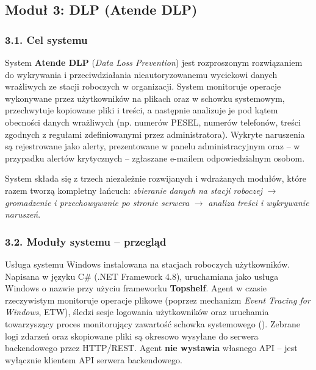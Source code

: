 \subsection*{Moduł 3: DLP (Atende DLP)}

\subsubsection*{3.1. Cel systemu}

System \textbf{Atende DLP} (\emph{Data Loss Prevention}) jest rozproszonym rozwiązaniem do wykrywania
i przeciwdziałania nieautoryzowanemu wyciekowi danych wrażliwych ze stacji roboczych w organizacji.
System monitoruje operacje wykonywane przez użytkowników na plikach oraz w schowku systemowym,
przechwytuje kopiowane pliki i treści, a następnie analizuje je pod kątem obecności danych
wrażliwych (np. numerów PESEL, numerów telefonów, treści zgodnych z regułami zdefiniowanymi przez
administratora). Wykryte naruszenia są rejestrowane jako alerty, prezentowane w panelu
administracyjnym oraz -- w przypadku alertów krytycznych -- zgłaszane e-mailem odpowiedzialnym
osobom.

System składa się z trzech niezależnie rozwijanych i wdrażanych modułów, które razem tworzą
kompletny łańcuch: \emph{zbieranie danych na stacji roboczej} $\rightarrow$ \emph{gromadzenie
i przechowywanie po stronie serwera} $\rightarrow$ \emph{analiza treści i wykrywanie naruszeń}.

\subsubsection*{3.2. Moduły systemu -- przegląd}

Usługa systemu Windows instalowana na stacjach roboczych użytkowników. Napisana w języku C\#
(.NET Framework 4.8), uruchamiana jako usługa Windows o nazwie  przy użyciu
frameworku \textbf{Topshelf}. Agent w czasie rzeczywistym monitoruje operacje plikowe (poprzez
mechanizm \emph{Event Tracing for Windows}, ETW), śledzi sesje logowania użytkowników oraz uruchamia
towarzyszący proces monitorujący zawartość schowka systemowego ().
Zebrane logi zdarzeń oraz skopiowane pliki są okresowo wysyłane do serwera backendowego przez HTTP/REST.
Agent \textbf{nie wystawia} własnego API -- jest wyłącznie klientem API serwera backendowego.


